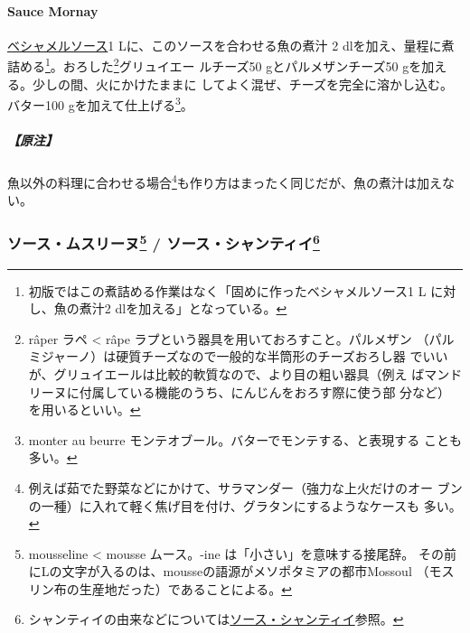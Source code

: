 \begin{recette}
\hypertarget{sauce-mornay}{%
\paragraph{Sauce Mornay}\label{sauce-mornay}}


\protect\hyperlink{sauce-bechamel}{ベシャメルソース}1
Lに、このソースを合わせる魚の煮汁 2
dlを加え、\deuxtiers{}量程に煮詰める\footnote{初版ではこの煮詰める作業はなく「固めに作ったベシャメルソース1
  L に対し、魚の煮汁2 dlを加える」となっている。}。おろした\footnote{râper
  ラペ \textless{} râpe ラプという器具を用いておろすこと。パルメザン
  （パルミジャーノ）は硬質チーズなので一般的な半筒形のチーズおろし器
  でいいが、グリュイエールは比較的軟質なので、より目の粗い器具（例え
  ばマンドリーヌに付属している機能のうち、にんじんをおろす際に使う部
  分など）を用いるといい。}グリュイエー ルチーズ50 gとパルメザンチーズ50
gを加える。少しの間、火にかけたままに
してよく混ぜ、チーズを完全に溶かし込む。バター100
gを加えて仕上げる\footnote{monter au beurre
  モンテオブール。バターでモンテする、と表現する ことも多い。}。

\hypertarget{ux539fux6ce8-13}{%
\subparagraph{【原注】}\label{ux539fux6ce8-13}}

魚以外の料理に合わせる場合\footnote{例えば茹でた野菜などにかけて、サラマンダー（強力な上火だけのオー
  ブンの一種）に入れて軽く焦げ目を付け、グラタンにするようなケースも
  多い。}も作り方はまったく同じだが、魚の煮汁は加えない。

\maeaki

\hypertarget{ux30bdux30fcux30b9ux30e0ux30b9ux30eaux30fcux30cc84-ux30bdux30fcux30b9ux30b7ux30e3ux30f3ux30c6ux30a3ux30a485}{%
\subsubsection[ソース・ムスリーヌ /
ソース・シャンティイ]{\texorpdfstring{ソース・ムスリーヌ\footnote{mousseline
  \textless{} mousse ムース。-ine は「小さい」を意味する接尾辞。
  その前にLの文字が入るのは、mousseの語源がメソポタミアの都市Mossoul
  （モスリン布の生産地だった）であることによる。} /
ソース・シャンティイ\footnote{シャンティイの由来などについては\protect\hyperlink{sauce-chantilly}{ソース・シャンティイ}参照。}}{ソース・ムスリーヌ / ソース・シャンティイ}}\label{ux30bdux30fcux30b9ux30e0ux30b9ux30eaux30fcux30cc84-ux30bdux30fcux30b9ux30b7ux30e3ux30f3ux30c6ux30a3ux30a485}}


\end{recette}

